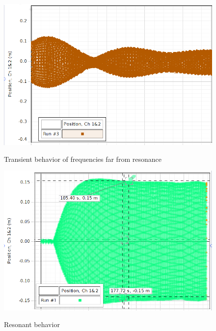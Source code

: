 \documentclass[twocolumn,english]{IEEEtran}
\theoremstyle{plain}
\theoremstyle{plain}
\begin{document}
\begin{figure}[h!]
  \begin{centering}
  \begin{center}
  \includegraphics[width=\linewidth]{./transcience.png}
  \label{fig:transcience}
  \caption{Transient behavior of frequencies far from resonance}
  \end{center}
  \par\end{centering}
  \end{figure}
\appendices{}

\begin{figure}[h!]
  \begin{centering}
  \begin{center}
  \includegraphics[width=\linewidth]{./resonance.png}
  \label{fig:resonance}
  \caption{Resonant behavior}
  \end{center}
  \par\end{centering}
  \end{figure}
\appendices{}
\end{document}
